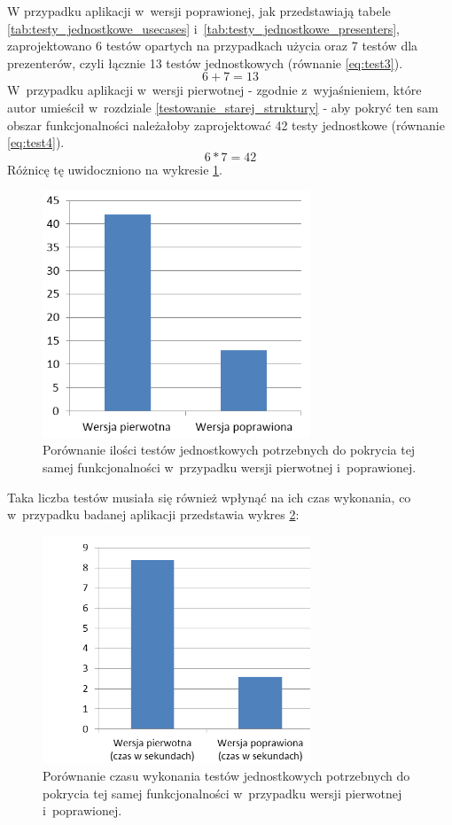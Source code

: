 \newpage
W przypadku aplikacji w~wersji poprawionej, jak przedstawiają tabele \ref{tab:testy_jednostkowe_usecases} i~\ref{tab:testy_jednostkowe_presenters}, zaprojektowano 6 testów opartych na przypadkach użycia oraz 7 testów dla prezenterów, czyli łącznie 13 testów jednostkowych (równanie \ref{eq:test3}).
\begin{equation}
6+7 = 13 \label{eq:test3}
\end{equation}
W~przypadku aplikacji w~wersji pierwotnej - zgodnie z~wyjaśnieniem, które autor umieścił w~rozdziale \ref{testowanie_starej_struktury} - aby pokryć ten sam obszar funkcjonalności należałoby zaprojektować 42 testy jednostkowe (równanie \ref{eq:test4}).
\begin{equation}
6*7 = 42 \label{eq:test4}
\end{equation}
Różnicę tę uwidoczniono na wykresie \ref{fig:app_ut_liczba}.
\begin{figure}[!htb]
    \centering
    \includegraphics[width=8cm]{imgs/ch6_app_ut_liczba.png}
    \caption
{Porównanie ilości testów jednostkowych potrzebnych do pokrycia tej samej funkcjonalności w~przypadku wersji pierwotnej i~poprawionej. }
    \label{fig:app_ut_liczba}
\end{figure} 

Taka liczba testów musiała się również wpłynąć na ich czas wykonania, co w~przypadku badanej aplikacji przedstawia wykres \ref{fig:app_ut_czas}:
\begin{figure}[!htb]
    \centering
    \includegraphics[width=8cm]{imgs/ch6_app_ut_czas.png}
    \caption
{Porównanie czasu wykonania testów jednostkowych potrzebnych do pokrycia tej samej funkcjonalności w~przypadku wersji pierwotnej i~poprawionej. }
    \label{fig:app_ut_czas}
\end{figure} 


